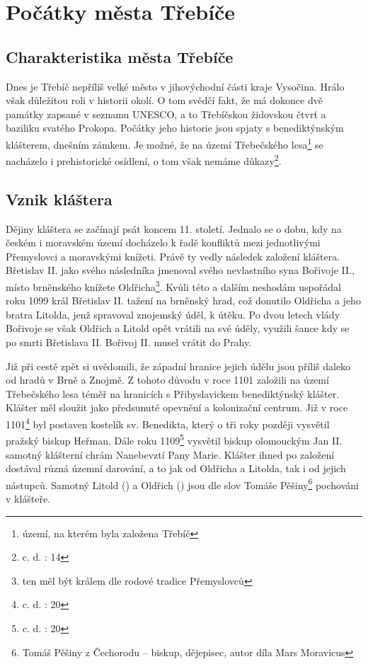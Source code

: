 \documentclass[a4paper,oneside,12p]{report}
\begin{document}


\tableofcontents
\newpage




\setcounter{page}{1}

\chapter{Počátky města Třebíče}

\section{Charakteristika města Třebíče}

Dnes je Třebíč nepříliš velké město v jihovýchodní části kraje Vysočina.
Hrálo však důležitou roli v historii okolí.
O tom svědčí fakt, že má dokonce dvě památky zapsané v seznamu UNESCO, a to Třebíčskou židovskou čtvrť a baziliku svatého Prokopa.
Počátky jeho historie jsou spjaty s benediktýnským klášterem, dnešním zámkem.
Je možné, že na území Třebečského lesa\footnote{území, na kterém byla založena Třebíč} se nacházelo i prehistorické osídlení, o tom však nemáme důkazy\footnote{c. d. : 14}.

\section{Vznik kláštera}

Dějiny kláštera se začínají psát koncem 11. století.
Jednalo se o dobu, kdy na českém i moravském území docházelo k řadě konfliktů mezi jednotlivými Přemyslovci a moravskými knížeti. Právě ty vedly následek založení kláštera.
Břetislav II. jako svého následníka jmenoval svého nevlastního syna Bořivoje II., místo brněnského knížete Oldřicha\footnote{ten měl být králem dle rodové tradice Přemyslovců}.
Kvůli této a dalším neshodám uspořádal roku 1099 král Břetislav II. tažení na brněnský hrad, což donutilo Oldřicha a jeho bratra Litolda, jenž spravoval znojemský úděl, k útěku.
Po dvou letech vlády Bořivoje se však Oldřich a Litold opět vrátili na své úděly, využili šance kdy se po smrti Břetislava II. Bořivoj II. musel vrátit do Prahy.

Již při cestě zpět si uvědomili, že západní hranice jejich údělu jsou příliš daleko od hradů v Brně a Znojmě.
Z tohoto důvodu v roce 1101 založili na území Třebečského lesa téměř na hranicích s Přibyslavickem benediktýnský klášter.
Klášter měl sloužit jako předsunuté opevnění a kolonizační centrum.
Již v roce 1101\footnote{c. d. : 20} byl postaven kostelík sv. Benedikta, který o tři roky později vysvětil pražský biskup Heřman.
Dále roku 1109\footnote{c. d. : 20} vysvětil biskup olomouckým Jan II. samotný klášterní chrám Nanebevztí Pany Marie.
Klášter ihned po založení dostával různá územní darování, a to jak od Oldřicha a Litolda, tak i od jejich nástupců.
Samotný Litold () a Oldřich () jsou dle slov Tomáše Pěšiny\footnote{Tomáš Pěšiny z Čechorodu -- biskup, dějepisec, autor díla Mars Moravicus} pochováni v klášteře.
\end{document}
